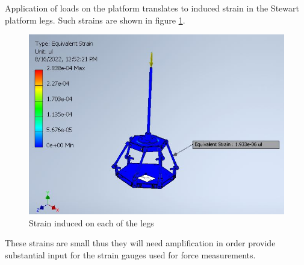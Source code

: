 Application of loads on the platform translates to induced strain in the Stewart platform legs. Such strains are shown in figure \ref{eq}.
\begin{center}
	\begin{figure}[H]
	\centering
	\includegraphics[width=0.6\linewidth]{Figures/Equivalent}
	\caption[Equivalent strain]{Strain induced on each of the legs}
	\label{eq}
	\end{figure}
\end{center}
These strains are small thus they will need amplification in order provide substantial input for the strain gauges used for force measurements. 
